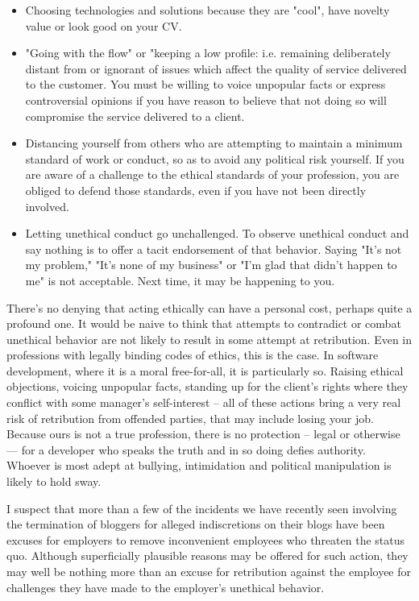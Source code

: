\documentclass{article}
\begin{document}
\begin{enumerate}
\begin{itemize}
\item Choosing technologies and solutions because they are "cool", have
novelty value or look good on your CV.\\
\item "Going with the flow" or "keeping a low profile: i.e. remaining
deliberately distant from or ignorant of issues which affect the
quality of service delivered to the customer. You must be willing to
voice unpopular facts or express controversial opinions if you have
reason to believe that not doing so will compromise the service
delivered to a client.\\
\item Distancing yourself from others who are attempting to maintain a
minimum standard of work or conduct, so as to avoid any political
risk yourself. If you are aware of a challenge to the ethical
standards of your profession, you are obliged to defend those
standards, even if you have not been directly involved.\\
\item Letting unethical conduct go unchallenged. To observe unethical
conduct and say nothing is to offer a tacit endorsement of that
behavior. Saying "It's not my problem," "It's none of my business" or
"I'm glad that didn't happen to me" is not acceptable. Next time, it
may be happening to you.
\end{itemize}

There's no denying that acting ethically can have a personal cost,
perhaps quite a profound one. It would be naive to think that attempts
to contradict or combat unethical behavior are not likely to result in
some attempt at retribution. Even in professions with legally binding
codes of ethics, this is the case. In software development, where it is
a moral free-for-all, it is particularly so. Raising ethical objections,
voicing unpopular facts, standing up for the client's rights where they
conflict with some manager's self-interest -- all of these actions bring
a very real risk of retribution from offended parties, that may include
losing your job. Because ours is not a true profession, there is no
protection -- legal or otherwise --- for a developer who speaks the
truth and in so doing defies authority. Whoever is most adept at
bullying, intimidation and political manipulation is likely to hold
sway.

I suspect that more than a few of the incidents we have recently seen
involving the termination of bloggers for alleged indiscretions on their
blogs have been excuses for employers to remove inconvenient employees
who threaten the status quo. Although superficially plausible reasons
may be offered for such action, they may well be nothing more than an
excuse for retribution against the employee for challenges they have
made to the employer's unethical behavior.


\end{enumerate}
\end{document}
